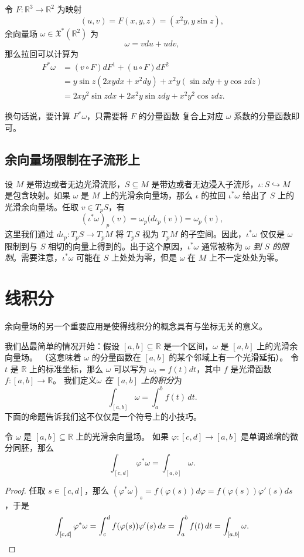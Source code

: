 \begin{example}
  令 $F:\mathbb{R}^3\to \mathbb{R}^2$ 为映射
  \[
    (u,v)=F(x,y,z) =(x^2y,y\sin z),
  \]
  余向量场 $\omega\in \mathfrak{X}^*(\mathbb{R}^2)$ 为
  \[
    \omega=vdu+udv,  
  \]
  那么拉回可以计算为
  \begin{align*}
    F^*\omega&=(v\circ F)dF^1+(u\circ F)dF^2\\
    &=y\sin z (2xydx+x^2dy)+x^2y(\sin zdy+y\cos zdz)\\
    &=2xy^2\sin z dx+2x^2y\sin zdy+x^2y^2\cos zdz.
  \end{align*}
\end{example}

换句话说，要计算 $F^*\omega$，只需要将 $F$ 的分量函数
复合上对应 $\omega$ 系数的分量函数即可。

\subsection{余向量场限制在子流形上}

设 $M$ 是带边或者无边光滑流形，$S\subseteq M$ 是带边或者无边浸入子流形，$\iota:S\hookrightarrow M$
是包含映射。如果 $\omega$ 是 $M$ 上的光滑余向量场，那么 $\iota$ 的拉回 $\iota^*\omega$ 给出了
$S$ 上的光滑余向量场。任取 $v\in T_pS$，有
\[
  (\iota^*\omega)_p(v)=\omega_p\bigl(d\iota_p(v)\bigr)=\omega_p(v),
\]
这里我们通过 $d\iota_p:T_pS\to T_pM$ 将 $T_pS$ 视为 $T_pM$ 的子空间。因此，$\iota^*\omega$
仅仅是 $\omega$ 限制到与 $S$ 相切的向量上得到的。出于这个原因，$\iota^*\omega$ 通常被称为
\emph{$\omega$ 到 $S$ 的限制}。需要注意，$\iota^*\omega$ 可能在 $S$ 上处处为零，但是 $\omega$
在 $M$ 上不一定处处为零。



\section{线积分}

余向量场的另一个重要应用是使得线积分的概念具有与坐标无关的意义。

我们丛最简单的情况开始：假设 $[a,b]\subseteq \mathbb{R}$
是一个区间，$\omega$ 是 $[a,b]$ 上的光滑余向量场。
（这意味着 $\omega$ 的分量函数在 $[a,b]$ 的某个邻域上有一个光滑延拓）。
令 $t$ 是 $\mathbb{R}$ 上的标准坐标，那么 $\omega$ 可以写为
$\omega_t=f(t)dt$，其中 $f$ 是光滑函数 $f:[a,b]\to \mathbb{R}$。
我们定义\emph{$\omega$ 在 $[a,b]$ 上的积分}为
\[
  \int_{[a,b]}\omega=\int_a^b f(t) \, dt.  
\]
下面的命题告诉我们这不仅仅是一个符号上的小技巧。

\begin{proposition}[积分的微分同胚不变性]\label{prop:diffeomorphic invariance of line integral}
  令 $\omega$ 是 $[a,b]\subseteq \mathbb{R}$ 上的光滑余向量场。
  如果 $\varphi:[c,d]\to[a,b]$ 是单调递增的微分同胚，那么
  \[
    \int_{[c,d]}\varphi^*\omega=\int_{[a,b]}\omega.  
  \]
\end{proposition}
\begin{proof}
  任取 $s\in [c,d]$，那么 
  $(\varphi^*\omega)_s=f(\varphi(s)) d\varphi=f(\varphi(s))\varphi'(s)ds$，于是
  \[
    \int_{[c,d]}\varphi^*\omega=\int_c^d f(\varphi(s))\varphi'(s)\, ds
    =\int_a^b f(t)\, dt=\int_{[a,b]}\omega.\qedhere
  \]
\end{proof}

